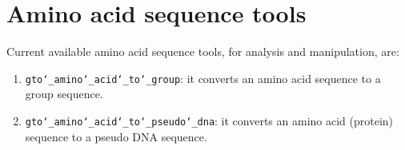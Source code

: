 \chapter{Amino acid sequence tools}
\label{seq}

Current available amino acid sequence tools, for analysis and manipulation, are:
\begin{enumerate}
	
\item \texttt{gto\char`_amino\char`_acid\char`_to\char`_group}: it converts an amino acid sequence to a group sequence.

\item \texttt{gto\char`_amino\char`_acid\char`_to\char`_pseudo\char`_dna}: it converts an amino acid (protein) sequence to a pseudo DNA sequence.

\end{enumerate}



